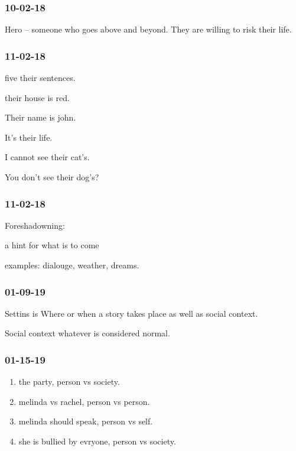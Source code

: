 
{\setlength{\parindent}{0cm}

\subsubsection{10-02-18}

Hero -- someone who goes above and beyond. They are willing to risk their life. 

\subsubsection{11-02-18}

five their sentences.

their house is red. 

Their name is john. 

It’s their life. 

I cannot see their cat’s. 

You don’t see their dog’s? 

\subsubsection{11-02-18}

Foreshadowning:

a hint for what is to come

examples:
dialouge, weather, dreams.

\subsubsection{01-09-19}

Settins is Where or when a story takes place as well as social context.

Social context whatever is considered normal. 

\subsubsection{01-15-19}
\begin{enumerate}
  \item the party, person vs society.
  \item melinda vs rachel, person vs person.
  \item melinda should speak, person vs self.
  \item she is bullied by evryone, person vs society.
\end{enumerate}
}


